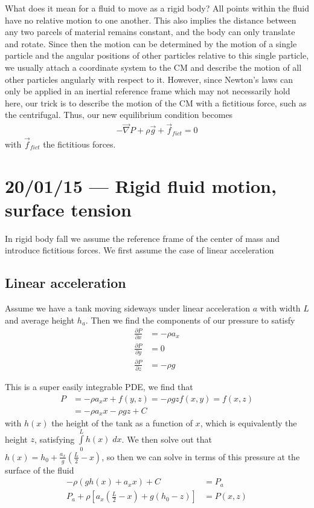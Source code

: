 \documentclass[10pt]{report}
\newcommand{\pd}[2]{\frac{\partial #1}{\partial#2}}
\begin{document}
What does it mean for a fluid to move as a rigid body? All points within the fluid have no relative motion to one another. This also implies the distance between any two parcels of material remains constant, and the body can only translate and rotate. Since then the motion can be determined by the motion of a single particle and the angular positions of other particles relative to this single particle, we usually attach a coordinate system to the CM and describe the motion of all other particles angularly with respect to it. However, since Newton's laws can only be applied in an inertial reference frame which may not necessarily hold here, our trick is to describe the motion of the CM with a fictitious force, such as the centrifugal. Thus, our new equilibrium condition becomes
\begin{align}
    -\vec{\nabla} P + \rho \vec{g} + \vec{f}_{fict} = 0
\end{align}
with $\vec{f}_{fict}$ the fictitious forces.
\chapter{20/01/15 --- Rigid fluid motion, surface tension}

In rigid body fall we assume the reference frame of the center of mass and introduce fictitious forces. We first assume the case of linear acceleration

\section{Linear acceleration}

Assume we have a tank moving sideways under linear acceleration $a$ with width $L$ and average height $h_a$. Then we find the components of our pressure to satisfy
\begin{align}
    \pd{P}{x} &= -\rho a_x\\
    \pd{P}{y} &= 0\\
    \pd{P}{z} &= -\rho g
\end{align}

This is a super easily integrable PDE, we find that
\begin{align}
    P &= -\rho a_xx + f(y,z) = -\rho g z f(x,y) = f(x,z)\\
    &= -\rho a_xx - \rho gz + C
\end{align}
with $h(x)$ the height of the tank as a function of $x$, which is equivalently the height $z$, satisfying $\int\limits_{0}^{L}h(x)\;dx$. We then solve out that $h(x)  = h_0 + \frac{a_x}{g}\left( \frac{L}{2} - x \right)$, so then we can solve in terms of this pressure at the surface of the fluid
\begin{align}
    -\rho\left( gh(x) + a_xx \right) + C &= P_a\\
    P_a + \rho\left[ a_x\left( \frac{L}{2} - x \right) + g (h_0 - z) \right] &= P(x,z)
\end{align}
\end{document}
